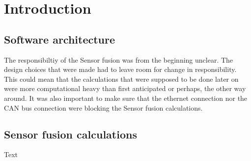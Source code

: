 \section{Introduction}\label{sec:introduction}
\subsection{Software architecture}
The responsibiltiy of the Sensor fusion was from the beginning unclear. The design
choices that were made had to leave room for change in responsibility.
This could mean that the calculations that were supposed to be done later on were
more computational heavy than first anticipated or perhaps, the other way around.
It was also important to make sure that the ethernet connection nor the CAN bus
connection were blocking the Sensor fusion calculations.
 
\subsection{Sensor fusion calculations}
Text
